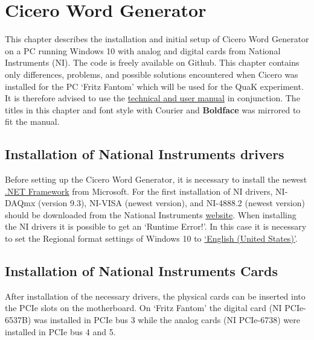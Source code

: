 
\chapter{Cicero Word Generator}\label{chap:Cicero}
This chapter describes the installation and initial setup of Cicero Word Generator\autocite{keshet2013distributed} on a PC running Windows 10 with analog and digital cards from National Instruments (NI). The code is freely available on Github\autocite{akeshet:Github}. This chapter contains only differences, problems, and possible solutions encountered when Cicero was installed for the PC `Fritz Fantom' which will be used for the QuaK experiment. It is therefore advised to use the \href{http://akeshet.github.io/Cicero-Word-Generator/Cicero\%20Technical\%20and\%20User\%20Manual.pdf}{technical and user manual} in conjunction. The titles in this chapter and font style with {\selectfont Courier} and \textbf{Boldface} was mirrored to fit the manual.

\section{Installation of National Instruments drivers}\label{sec:NI Drivers}
Before setting up the Cicero Word Generator, it is necessary to install the newest \href{https://dotnet.microsoft.com/download}{.NET Framework} from Microsoft. For the first installation of NI drivers, NI-DAQmx (version 9.3), NI-VISA (newest version), and NI-4888.2 (newest version) should be downloaded from the National Instruments  \href{http://www.ni.com/en-us/support/downloads/drivers.html}{website}. When installing the NI drivers it is possible to get an `Runtime Error!'. In this case it is necessary to set the Regional format settings of Windows 10 to \href{https://knowledge.ni.com/KnowledgeArticleDetails?id=kA00Z0000019YOnSAM&l}{`English (United States)'}.

\section{Installation of National Instruments Cards}\label{sec:NI Cards}
After installation of the necessary drivers, the physical cards can be inserted into the PCIe slots on the motherboard. On `Fritz Fantom' the digital card (NI PCIe-6537B) was installed in PCIe bus 3 while the analog cards (NI PCIe-6738) were installed in PCIe bus 4 and 5.

